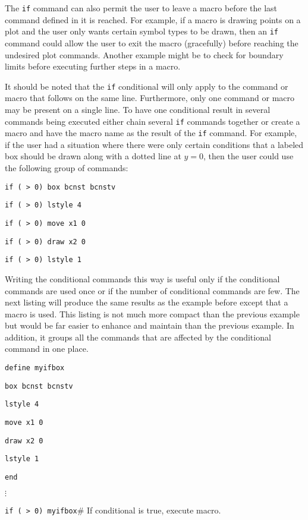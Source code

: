 The {\tt if} command can also permit the user
to leave a macro before the last command defined in it is reached.
For example, if a macro is drawing points on a plot and the user only
wants certain symbol types to be drawn, then an {\tt if} command could
allow the user to exit the macro (gracefully) before reaching the undesired
plot commands.
Another example might be to check for boundary limits before executing
further steps in a macro.

It should be noted that the {\tt if} conditional will only apply to the
command or macro that follows on the same line.
Furthermore, only one command or macro
may be present on a single line.
To have one conditional result in several commands being executed either
chain several {\tt if} commands together or create a macro and have the
macro name as the result of the {\tt if} command.
For example, if the user had a situation where there were only certain
conditions that a labeled box should be drawn along with a dotted line
at $y = 0$, then the user could use
the following group of commands:
\begin{wiplist}%
  \item {\tt if ( > 0) box bcnst bcnstv}
  \item {\tt if ( > 0) lstyle 4}
  \item {\tt if ( > 0) move x1 0}
  \item {\tt if ( > 0) draw x2 0}
  \item {\tt if ( > 0) lstyle 1}
\end{wiplist}
Writing the conditional commands this way is useful
only if the conditional commands are used once
or if the number of conditional commands are few.
The next listing will produce the same results as the example before
except that a macro is used.
This listing is not much more compact than the previous example but
would be far easier to enhance and maintain than the previous example.
In addition, it groups all the commands that are affected by the
conditional command in one place.
\begin{wiplist}%
  \item [\wipp] {\tt define myifbox}
\samepage
  \item [\wipd] {\tt box bcnst bcnstv}
  \item [\wipd] {\tt lstyle 4}
  \item [\wipd] {\tt move x1 0}
  \item [\wipd] {\tt draw x2 0}
  \item [\wipd] {\tt lstyle 1}
  \item [\wipd] {\tt end}
  \item [{$\vdots$}]
  \item [\wipp] {\tt if ( > 0) myifbox}\hfill\# If conditional is true,
        execute macro.
\end{wiplist}


